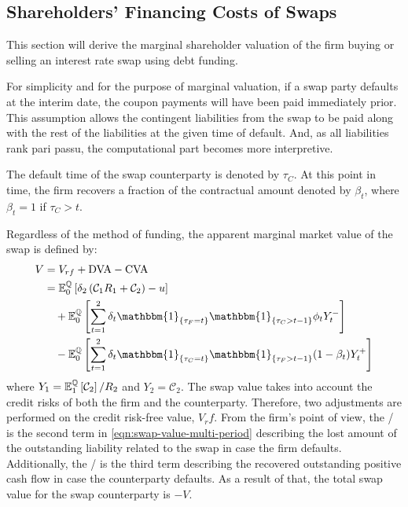 \documentclass[main.tex]{subfiles}
\begin{document}
    \subsection{Shareholders' Financing Costs of Swaps}
    \label{sec:unsecured-swap-valuation}
        This section will derive the marginal shareholder valuation of the firm
        buying or selling an interest rate swap using debt funding.    

        For simplicity and for the purpose of marginal valuation,
        if a swap party defaults at the interim date, the coupon payments will have been paid immediately prior.
        This assumption allows the contingent liabilities from the swap to be paid along with the rest of the liabilities at the given time of default.
        And, as all liabilities rank pari passu, the computational part becomes more interpretive.

        The default time of the swap counterparty is denoted by $\tau_{C}$.
        At this point in time, the firm recovers a fraction of the contractual amount denoted by $\beta_{t}$, where $\beta_{t} = 1$ if $\tau_{C}>t$.

        Regardless of the method of funding, the apparent marginal market value of the swap is defined by:
        \begin{align}
            V &= V_{rf} + \DVA/ - \CVA/
            \nonumber
            \\
            &=
            \mathbb{E}_{0}^{\rnmeasure}\left[
                \delta_2 \left(\mathcal{C}_{1} R_{1} + \mathcal{C}_{2}\right)
                - u
            \right]
            \nonumber
            \\
            &\quad +
            \mathbb{E}_{0}^{\rnmeasure}\left[
                \sum_{t=1}^{2} \delta_{t} \mathbbm{1}_{\{\tau_{F} = t\}}\mathbbm{1}_{\{\tau_{C}>t-1\}} \phi_t Y_{t}^{-} 
            \right]
            \nonumber
            \\
            &\quad -
            \mathbb{E}_{0}^{\rnmeasure}\left[
                \sum_{t=1}^{2} \delta_{t} \mathbbm{1}_{\{\tau_{C} = t\}}\mathbbm{1}_{\{\tau_{F}>t-1\}} (1-\beta_t) Y_{t}^{+} 
            \right]
            \label{eqn:swap-value-multi-period}
        \end{align}
        where $Y_{1} = \mathbb{E}_{1}^{\mathbb{Q}}\left[\mathcal{C}_{2}\right]/R_{2}$ and $Y_{2} = \mathcal{C}_{2}$.
        The swap value takes into account the credit risks of both the firm and the counterparty.
        Therefore, two adjustments are performed on the credit risk-free value, $V_rf$.
        From the firm's point of view,
        the \DVA/ is the second term in \cref{eqn:swap-value-multi-period} describing the lost amount of the outstanding liability related to the swap in case the firm defaults.
        Additionally, the \CVA/ is the third term describing the recovered outstanding positive cash flow in case the counterparty defaults.
        As a result of that, the total swap value for the swap counterparty is $-V$.
\end{document}
